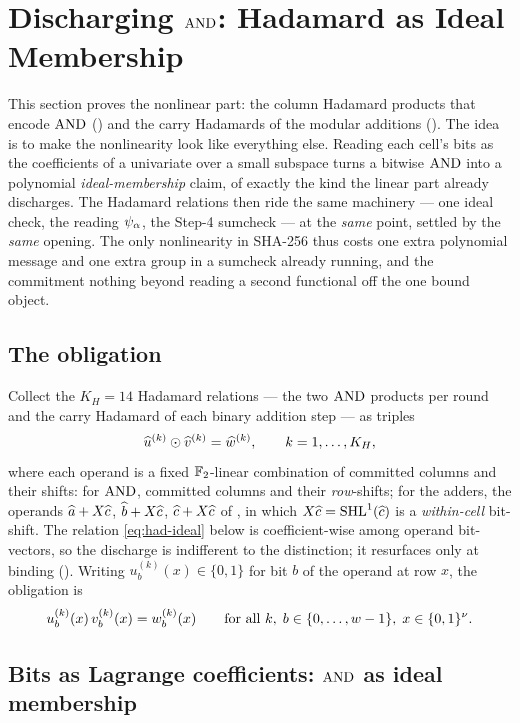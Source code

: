 \section{Discharging $\operatorname{AND}$: Hadamard as Ideal Membership}
\label{sec:hadamard}

This section proves the nonlinear part: the column Hadamard products that encode
$\operatorname{AND}$ () and the carry Hadamards of the modular additions
(). The idea is to make the nonlinearity look like everything
else. Reading each cell's bits as the coefficients of a univariate over a small
subspace turns a bitwise $\operatorname{AND}$ into a polynomial \emph{ideal-membership} claim,
of exactly the kind the linear part already discharges. The Hadamard relations
then ride the same machinery --- one ideal check, the reading $\psi_{\alpha}$, the
Step-4 sumcheck --- at the \emph{same} point, settled by the \emph{same} opening.
The only nonlinearity in SHA-256 thus costs one extra polynomial message and one
extra group in a sumcheck already running, and the commitment nothing beyond
reading a second functional off the one bound object.

\subsection{The obligation}
\label{sec:had-oblig}

Collect the $K_H = 14$ Hadamard relations --- the two $\operatorname{AND}$ products per round
and the carry Hadamard of each binary addition step --- as triples
\[
  \widehat{u}^{(k)}\odot\widehat{v}^{(k)} = \widehat{w}^{(k)},
  \qquad k = 1,\dots,K_H,
\]
where each operand is a fixed $\mathbb{F}_2$-linear combination of committed columns and
their shifts: for $\operatorname{AND}$, committed columns and their \emph{row}-shifts; for the
adders, the operands $\widehat{a}+X\widehat{c}$, $\widehat{b}+X\widehat{c}$, $\widehat{c}+X\widehat{c}$ of
, in which $X\widehat{c} = \operatorname{SHL}^{1}(\widehat{c})$ is a \emph{within-cell}
bit-shift. The relation \eqref{eq:had-ideal} below is coefficient-wise among
operand bit-vectors, so the discharge is indifferent to the distinction; it
resurfaces only at binding (). Writing
$u^{(k)}_b(x)\in\{0,1\}$ for bit $b$ of the operand at row $x$, the obligation is
\begin{equation}
  \label{eq:had-system}
  u^{(k)}_b(x)\,v^{(k)}_b(x) = w^{(k)}_b(x)
  \qquad \text{for all } k,\; b\in\{0,\dots,w-1\},\; x\in\{0,1\}^{\nu}.
\end{equation}

\subsection{Bits as Lagrange coefficients: $\operatorname{AND}$ as ideal membership}
\label{sec:psi-z}

